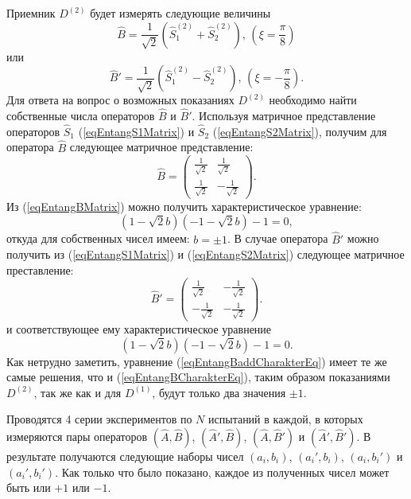 Приемник $D^{(2)}$ будет измерять следующие величины 
\[
\hat{B} = \frac{1}{\sqrt{2}}\left(\hat{S}_1^{(2)} + \hat{S}_2^{(2)}\right),\,(\xi =
\frac{\pi}{8}) 
\]
или 
\[
\hat{B}' = \frac{1}{\sqrt{2}}\left(\hat{S}_1^{(2)} - \hat{S}_2^{(2)}\right),\,(\xi =
- \frac{\pi}{8}).
\]
Для ответа на вопрос о возможных показаниях $D^{(2)}$ необходимо найти
собственные числа операторов $\hat{B}$ и $\hat{B}'$. Используя
матричное представление операторов $\hat{S}_1$
(\ref{eqEntangS1Matrix}) и $\hat{S}_2$ (\ref{eqEntangS2Matrix}),
получим для оператора $\hat{B}$ следующее матричное представление:
\begin{equation}
\hat{B} = 
\left(
\begin{array}{cc}
\frac{1}{\sqrt{2}} & \frac{1}{\sqrt{2}} \\
\frac{1}{\sqrt{2}} & -\frac{1}{\sqrt{2}} 
\end{array}
\right).
\label{eqEntangBMatrix}
\end{equation}
Из (\ref{eqEntangBMatrix}) можно получить характеристическое
уравнение:
\begin{equation}
\left(1 -\sqrt{2} b\right)\left(- 1 -\sqrt{2} b\right) -1 = 0,
\label{eqEntangBCharakterEq}
\end{equation}
откуда для собственных чисел имеем: $b = \pm 1$. В случае оператора
$\hat{B}'$  можно получить из (\ref{eqEntangS1Matrix}) и
(\ref{eqEntangS2Matrix}) следующее матричное преставление:
\begin{equation}
\hat{B}' = 
\left(
\begin{array}{cc}
\frac{1}{\sqrt{2}} & -\frac{1}{\sqrt{2}} \\
-\frac{1}{\sqrt{2}} & -\frac{1}{\sqrt{2}} 
\end{array}
\right).
\label{eqEntangBaddMatrix}
\end{equation}
и соответствующее ему характеристическое уравнение
\begin{equation}
\left(1 -\sqrt{2} b\right)\left(- 1 -\sqrt{2} b\right) -1 = 0.
\label{eqEntangBaddCharakterEq}
\end{equation}
Как нетрудно заметить, уравнение (\ref{eqEntangBaddCharakterEq}) имеет
те же самые решения, что и (\ref{eqEntangBCharakterEq}), таким образом
показаниями $D^{(2)}$, так же как и для $D^{(1)}$, будут только два
значения $\pm 1$.

Проводятся 4 серии экспериментов по $N$ испытаний в каждой, в которых
измеряются пары операторов $\left(\hat{A},\hat{B}\right)$,
$\left(\hat{A}',\hat{B}\right)$, $\left(\hat{A},\hat{B}'\right)$ и
$\left(\hat{A}',\hat{B}'\right)$. В результате получаются следующие
наборы чисел $\left(a_i, b_i\right)$, $\left(a_i', b_i\right)$, $\left(a_i, b_i'\right)$ и
$\left(a_i', b_i'\right)$. Как только что было показано, каждое
из полученных чисел может быть или $+1$ или $-1$.

